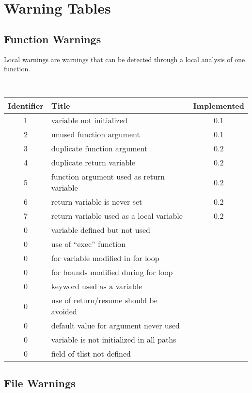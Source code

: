 \section{Warning Tables}

\subsection{Function Warnings}



Local warnings are warnings that can be detected through a local analysis of
one function.



\noindent\\\begin{tabular}{|c|p{8cm}|c|} \hline
Identifier & Title & Implemented      \\ \hline
  1 & variable not initialized & 0.1 \\ \hline
  2 & unused function argument & 0.1 \\ \hline
  3 & duplicate function argument & 0.2 \\ \hline
  4 & duplicate return variable   & 0.2 \\ \hline
  5 & function argument used as return variable   & 0.2 \\ \hline
  6 & return variable is never set & 0.2 \\ \hline
  7 & return variable used as a local variable & 0.2 \\ \hline
  0 & variable defined but not used &  \\ \hline
  0 & use of ``exec'' function      &  \\ \hline
  0 & for variable modified in for loop &  \\ \hline
  0 & for bounds modified during for loop &  \\ \hline
  0 & keyword used as a variable &  \\ \hline
  0 & use of return/resume should be avoided &  \\ \hline
  0 & default value for argument never used &  \\ \hline
  0 & variable is not initialized in all paths &  \\ \hline
  0 & field of tlist not defined &  \\ \hline
\end{tabular}

\subsection{File Warnings}

